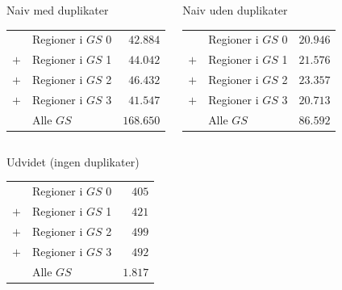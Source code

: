 \documentclass[xcolor=table]{beamer}
\begin{document}
\begin{frame}
{    
    \begin{columns}[c]
        \begin{exampleblock}{Naiv \alert{med duplikater}}
            \begin{tabular}{r@{\ \ }p{7em}r}
                & Regioner i $GS$ 0             &  $42.884$ \\
                $+$ & Regioner i $GS$ 1             &  $44.042$ \\
                $+$ & Regioner i \alert{$GS$ 2}             &  \alert{$46.432$} \\
                $+$ & Regioner i $GS$ 3             &  $41.547$ \\\hline
                & Alle $GS$       & $168.650$
            \end{tabular}
        \end{exampleblock}
        \begin{exampleblock}{Naiv uden duplikater}
            \begin{tabular}{r@{\ \ }p{7em}r}
                & Regioner i $GS$ 0             &  $20.946$ \\
                $+$ & Regioner i $GS$ 1             &  $21.576$ \\
                $+$ & Regioner i \alert{$GS$ 2}             &  \alert{$23.357$} \\
                $+$ & Regioner i $GS$ 3             &  $20.713$ \\\hline
                & Alle $GS$       & $86.592$
            \end{tabular}
        \end{exampleblock}
    \end{columns}
    \begin{exampleblock}{Udvidet (ingen duplikater)}
        \centering
        \begin{tabular}{r@{\ \ }p{12em}r}
            & Regioner i $GS$ 0         &  $405$ \\
            $+$ & Regioner i $GS$ 1         &  $421$ \\
            $+$ & Regioner i \alert{$GS$ 2}         &  \alert{$499$} \\
            $+$ & Regioner i $GS$ 3         &  $492$ \\\hline
            & Alle $GS$   & $1.817$
        \end{tabular}
    \end{exampleblock}
    }

\end{frame}
\end{document}
